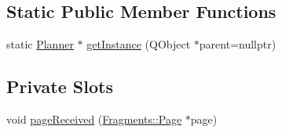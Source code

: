 \subsection*{Static Public Member Functions}
\begin{DoxyCompactItemize}
\item 
static \mbox{\hyperlink{classCSA_1_1Planner}{Planner}} $\ast$ \mbox{\hyperlink{classCSA_1_1Planner_a0a361e4991bc8f1f29b41507c13ea590}{get\+Instance}} (Q\+Object $\ast$parent=nullptr)
\end{DoxyCompactItemize}
\subsection*{Private Slots}
\begin{DoxyCompactItemize}
\item 
void \mbox{\hyperlink{classCSA_1_1Planner_ac1b6ffca527db0fe0ff6f904b6a0ee35}{page\+Received}} (\mbox{\hyperlink{classFragments_1_1Page}{Fragments\+::\+Page}} $\ast$page)
\end{DoxyCompactItemize}
